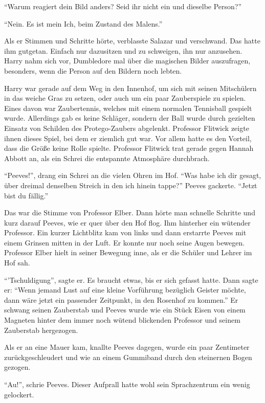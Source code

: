 \enquote{Warum reagiert dein Bild anders? Seid ihr nicht ein und dieselbe Person?}

\enquote{Nein. Es ist mein Ich, beim Zustand des Malens.}

Als er Stimmen und Schritte hörte, verblasste Salazar und verschwand. Das hatte ihm gutgetan. Einfach nur dazusitzen und zu schweigen, ihn nur anzusehen. Harry nahm sich vor, Dumbledore mal über die magischen Bilder auszufragen, besonders, wenn die Person auf den Bildern noch lebten.

\trenn

Harry war gerade auf dem Weg in den Innenhof, um sich mit seinen Mitschülern in das weiche Gras zu setzen, oder auch um ein paar Zauberspiele zu spielen. Eines davon war Zaubertennis, welches mit einem normalen Tennisball gespielt wurde. Allerdings gab es keine Schläger, sondern der Ball wurde durch gezielten Einsatz von Schilden des Protego-Zaubers abgelenkt. Professor Flitwick zeigte ihnen dieses Spiel, bei dem er ziemlich gut war. Vor allem hatte es den Vorteil, dass die Größe keine Rolle spielte. Professor Flitwick trat gerade gegen Hannah Abbott an, als ein Schrei die entspannte Atmosphäre durchbrach.

\enquote{Peeves!}, drang ein Schrei an die vielen Ohren im Hof. \enquote{Was habe ich dir gesagt, über dreimal denselben Streich in den ich hinein tappe?} Peeves gackerte. \enquote{Jetzt bist du fällig.}

Das war die Stimme von Professor Elber. Dann hörte man schnelle Schritte und kurz darauf Peeves, wie er quer über den Hof flog. Ihm hinterher ein wütender Professor. Ein kurzer Lichtblitz kam von links und dann erstarrte Peeves mit einem Grinsen mitten in der Luft. Er konnte nur noch seine Augen bewegen. Professor Elber hielt in seiner Bewegung inne, als er die Schüler und Lehrer im Hof sah.

\enquote{'Tschuldigung}, sagte er. Es braucht etwas, bis er sich gefasst hatte. Dann sagte er: \enquote{Wenn jemand Lust auf eine kleine Vorführung bezüglich Geister möchte, dann wäre jetzt ein passender Zeitpunkt, in den Rosenhof zu kommen.} Er schwang seinen Zauberstab und Peeves wurde wie ein Stück Eisen von einem Magneten hinter dem immer noch wütend blickenden Professor und seinem Zauberstab hergezogen.

Als er an eine Mauer kam, knallte Peeves dagegen, wurde ein paar Zentimeter zurückgeschleudert und wie an einem Gummiband durch den steinernen Bogen gezogen.

\enquote{Au!}, schrie Peeves. Dieser Aufprall hatte wohl sein Sprachzentrum ein wenig gelockert.

